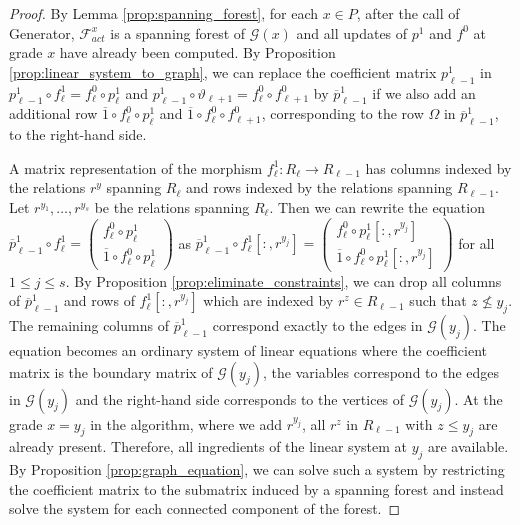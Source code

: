 \documentclass[english,a4paper,nolineno,cleveref]{socg-lipics-v2021}
\begin{document}
\begin{proof}
By Lemma \ref{prop:spanning_forest}, for each $x\in P$, after the call of {\sc Generator}, $\mathcal{F}^x_{act}$ is a spanning forest of $\mathcal{G}(x)$ and all updates of $p^1$ and $f^0$ at grade $x$ have already been computed. By Proposition \ref{prop:linear_system_to_graph}, we can replace the coefficient matrix $p_{\ell\minus 1}^1$ in $p_{\ell\minus 1}^1\circ f^1_\ell=f^0_\ell\circ p_\ell^1$ and $p_{\ell\minus 1}^1\circ\vartheta_{\ell+1}=f^0_\ell\circ f^0_{\ell+1}$ by $\overline{p}_{\ell\minus 1}^1$ if we also add an additional row $\overline{1}\circ f^0_\ell\circ p_\ell^1$ and $\overline{1}\circ f^0_\ell\circ f^0_{\ell+1}$, corresponding to the row $\Omega$ in $\overline{p}_{\ell\minus 1}^1$, to the right-hand side. 

A matrix representation of the morphism $f^1_\ell\colon R_\ell\rightarrow R_{\ell\minus 1}$ has columns indexed by the relations $r^y$ spanning $R_\ell$ and rows indexed by the relations spanning $R_{\ell\minus 1}$. Let $r^{y_1},\ldots,r^{y_s}$ be the relations spanning $R_\ell$. Then we can rewrite the equation $\overline{p}_{\ell\minus 1}^1\circ f^1_\ell=\begin{pmatrix}f^0_\ell\circ p_\ell^1 \\ \overline{1}\circ f^0_\ell\circ p_\ell^1\end{pmatrix}$ as $\overline{p}_{\ell\minus 1}^1\circ f^1_\ell[:,r^{y_j}]=\begin{pmatrix}f^0_\ell\circ p_\ell^1[:,r^{y_j}] \\ \overline{1}\circ f^0_\ell\circ p_\ell^1[:,r^{y_j}]\end{pmatrix}$ for all $1\leq j\leq s$. By Proposition \ref{prop:eliminate_constraints}, we can drop all columns of $\overline{p}_{\ell\minus 1}^1$ and rows of $f^1_\ell[:,r^{y_j}]$ which are indexed by $r^z\in R_{\ell\minus 1}$ such that $z\nleq y_j$. The remaining columns of $\overline{p}_{\ell\minus 1}^1$ correspond exactly to the edges in $\mathcal{G}(y_j)$. The equation becomes an ordinary system of linear equations where the coefficient matrix is the boundary matrix of $\mathcal{G}(y_j)$, the variables correspond to the edges in $\mathcal{G}(y_j)$ and the right-hand side corresponds to the vertices of $\mathcal{G}(y_j)$. At the grade $x=y_j$ in the algorithm, where we add $r^{y_j}$, all $r^z$ in $R_{\ell\minus 1}$ with $z\leq y_j$ are already present. Therefore, all ingredients of the linear system at $y_j$ are available. By Proposition \ref{prop:graph_equation}, we can solve such a system by restricting the coefficient matrix to the submatrix induced by a spanning forest and instead solve the system for each connected component of the forest. 


\end{proof}
\end{document}
